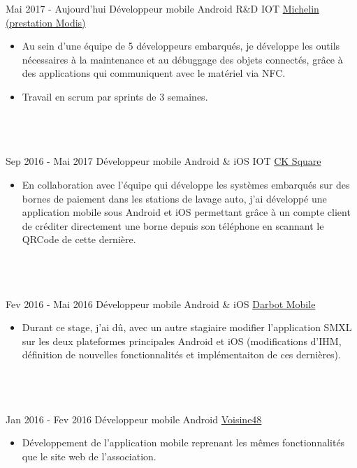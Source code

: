 \documentclass[letterpaper]{twentysecondcv} %
\begin{document}
\begin{twenty} %
\twentyitem
    	{Mai 2017 -}
		{Aujourd'hui}
        {Développeur mobile Android R\&D IOT}
        {\href{http://www.michelin.fr/}{Michelin (prestation Modis)}}
        {}
        {\begin{itemize}
        \item Au sein d'une équipe de 5 développeurs embarqués, je développe les outils nécessaires à la maintenance et au débuggage des objets connectés, grâce à des applications qui communiquent avec le matériel via NFC.
        \item Travail en scrum par sprints de 3 semaines.
        \end{itemize}}
        \\ \\ \\
	\twentyitem
    	{Sep 2016 -}
		{Mai 2017}
        {Développeur mobile Android \& iOS IOT}
        {\href{http://www.cksquare.fr/}{CK Square}}
        {}
        {
        {\begin{itemize}
        \item En collaboration avec l'équipe qui développe les systèmes embarqués sur des bornes de paiement dans les stations de lavage auto, j'ai développé une application mobile sous Android et iOS permettant grâce à un compte client de créditer directement une borne depuis son téléphone en scannant le QRCode de cette dernière.
    \end{itemize}}
        }
    \\ \\ \\
    \twentyitem
   		{Fev 2016 -}
		{Mai 2016}
        {Développeur mobile Android \& iOS}
        {\href{https://www.smxlapp.com/}{Darbot Mobile}}
        {}
        {
        {\begin{itemize}
        \item Durant ce stage, j'ai dû, avec un autre stagiaire modifier l'application SMXL sur les deux plateformes principales Android et iOS (modifications d'IHM, définition de nouvelles fonctionnalités et implémentaiton de ces dernières).
    \end{itemize}}
        }
     \\ \\ \\
     \twentyitem
   		{Jan 2016 -}
		{Fev 2016 }
        {Développeur mobile Android}
        {\href{http://www.voisine48.fr/}{Voisine48}}
        {}
        {
        \begin{itemize}
        \item Développement de l'application mobile reprenant les mêmes fonctionnalités que le site web de l'association.
    \end{itemize}
    	}
    	
    	\\ \\ \\
    
        
\end{twenty}
\end{document}
